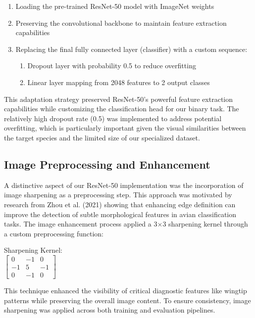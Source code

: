 \begin{enumerate}
    \item Loading the pre-trained ResNet-50 model with ImageNet weights
    \item Preserving the convolutional backbone to maintain feature extraction capabilities
    \item Replacing the final fully connected layer (classifier) with a custom sequence:
    \begin{enumerate}
        \item Dropout layer with probability 0.5 to reduce overfitting
        \item Linear layer mapping from 2048 features to 2 output classes
    \end{enumerate}
\end{enumerate}

This adaptation strategy preserved ResNet-50's powerful feature extraction capabilities while customizing the classification head for our binary task. The relatively high dropout rate (0.5) was implemented to address potential overfitting, which is particularly important given the visual similarities between the target species and the limited size of our specialized dataset\citep{stackoverflow}.

\subsection{Image Preprocessing and Enhancement}

A distinctive aspect of our ResNet-50 implementation was the incorporation of image sharpening as a preprocessing step. This approach was motivated by research from Zhou et al. (2021) showing that enhancing edge definition can improve the detection of subtle morphological features in avian classification tasks. The image enhancement process applied a 3$\times$3 sharpening kernel through a custom preprocessing function:

\begin{center}
Sharpening Kernel: \\
$\begin{bmatrix}
0 & -1 & 0 \\
-1 & 5 & -1 \\
0 & -1 & 0
\end{bmatrix}$
\end{center}

This technique enhanced the visibility of critical diagnostic features like wingtip patterns while preserving the overall image content. To ensure consistency, image sharpening was applied across both training and evaluation pipelines\citep{jatit}.

